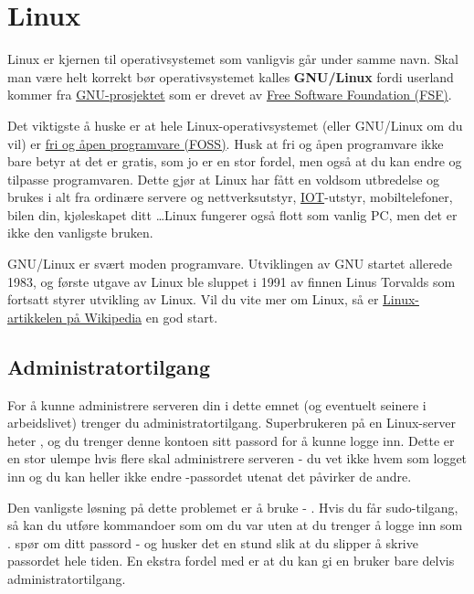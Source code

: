\chapter{Linux} %

Linux er kjernen til operativsystemet som vanligvis går under samme navn. Skal man være
helt korrekt bør operativsystemet kalles \textbf{GNU/Linux} 
fordi userland kommer fra \href{https://www.gnu.org/}{GNU-prosjektet}
som er drevet av \href{https://www.fsf.org/}{Free Software Foundation (FSF)}.

Det viktigste å huske er at hele Linux-operativsystemet (eller GNU/Linux om du vil) er 
\href{https://en.wikipedia.org/wiki/Free_and_open-source_software}{fri og åpen programvare (FOSS)}.
Husk at fri og åpen programvare ikke bare betyr at det er gratis, som jo er en stor fordel, men 
også at du kan endre og tilpasse programvaren. Dette gjør at Linux har fått en voldsom utbredelse
og brukes i alt fra ordinære servere og nettverksutstyr, 
\href{https://en.wikipedia.org/wiki/Internet_of_things}{IOT}-utstyr, mobiltelefoner, bilen din, 
kjøleskapet ditt \dots Linux fungerer også flott som vanlig PC, men det er ikke den vanligste 
bruken.

GNU/Linux er svært moden programvare. Utviklingen av GNU startet allerede 1983, og første utgave 
av Linux ble sluppet i 1991 av finnen Linus Torvalds som fortsatt styrer utvikling av Linux.
Vil du vite mer om Linux, så er 
\href{https://en.wikipedia.org/wiki/Linux}{Linux-artikkelen på Wikipedia} \cite{wiki:linux}
en god start.

\section{Administratortilgang}

For å kunne administrere serveren din i dette emnet (og eventuelt seinere i arbeidslivet) 
trenger du administratortilgang. Superbrukeren på en Linux-server heter , og du
trenger denne kontoen sitt passord for å kunne logge inn. Dette er en stor ulempe hvis flere
skal administrere serveren - du vet ikke hvem som logget inn og du kan heller ikke endre 
-passordet utenat det påvirker de andre.

Den vanligste løsning på dette problemet er å bruke  - . 
Hvis du får sudo-tilgang, så kan du utføre kommandoer som om du var  uten at du
trenger å logge inn som .  spør om ditt passord - og husker det en stund
slik at du slipper å skrive passordet hele tiden. En ekstra fordel med  er at
du kan gi en bruker bare delvis administratortilgang. 

